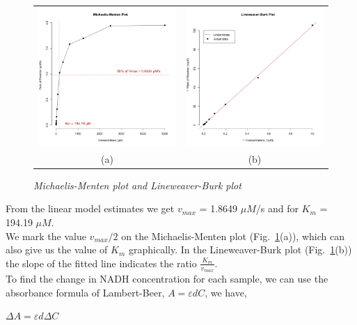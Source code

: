 \documentclass[a4paper,10pt]{article}
\begin{document}
                \begin{figure}[H]
                    \centering
                    \begin{tabular}{cc}
                        \includegraphics[width=220px]{../resources/kinetics_mmplot.png} &
                        \includegraphics[width=220px]{../resources/kinetics_lbplot.png} \\
                        (a) & (b)\\
                    \end{tabular}
                    \caption{\it Michaelis-Menten plot and Lineweaver-Burk plot}\label{fig:mm_plot}
                \end{figure}

                \noindent From the linear model estimates we get $v_{max}$ = 1.8649 $\mu M$/s and for $K_m$ = 194.19 $\mu M$.\\
                We mark the value $v_{max}/2$ on the Michaelis-Menten plot (Fig.~\ref{fig:mm_plot}(a)), which can
                also give us the value of $K_m$ graphically. 
                In the Lineweaver-Burk plot (Fig.~\ref{fig:mm_plot}(b)) the slope of the fitted line indicates 
                the ratio $\frac{K_m}{v_{max}}$.\\

                To find the change in NADH concentration for each sample, we can use the absorbance formula
                of Lambert-Beer, $A = \varepsilon d C$, we have,
                \begin{center}
                    $\Delta A = \varepsilon d \Delta C$
                \end{center}
\end{document}
